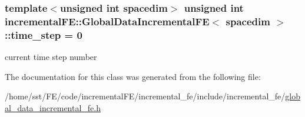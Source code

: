 \subsubsection[{\texorpdfstring{time\+\_\+step}{time_step}}]{\setlength{\rightskip}{0pt plus 5cm}template$<$unsigned int spacedim$>$ unsigned int {\bf incremental\+F\+E\+::\+Global\+Data\+Incremental\+FE}$<$ spacedim $>$\+::time\+\_\+step = 0\hspace{0.3cm}{\ttfamily [private]}}\hypertarget{classincremental_f_e_1_1_global_data_incremental_f_e_a2aa7544464ad55c39f44c9e7e04b4bf6}{}\label{classincremental_f_e_1_1_global_data_incremental_f_e_a2aa7544464ad55c39f44c9e7e04b4bf6}
current time step number 

The documentation for this class was generated from the following file\+:\begin{DoxyCompactItemize}
\item 
/home/sst/\+F\+E/code/incremental\+F\+E/incremental\+\_\+fe/include/incremental\+\_\+fe/\hyperlink{global__data__incremental__fe_8h}{global\+\_\+data\+\_\+incremental\+\_\+fe.\+h}\end{DoxyCompactItemize}
